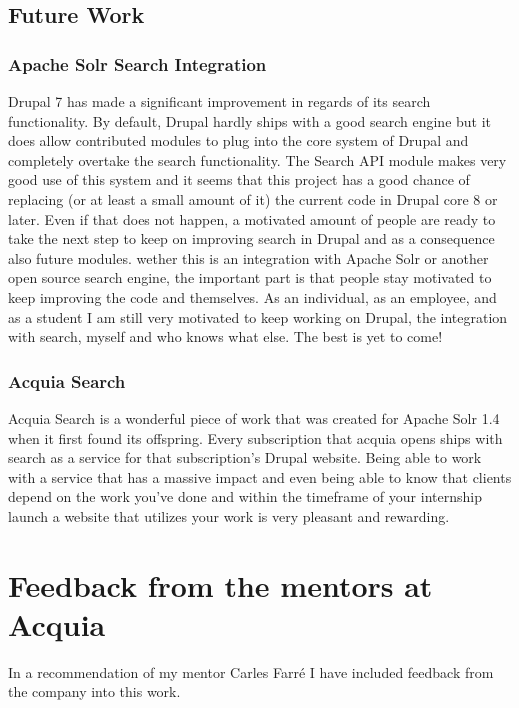 \section{Future Work}
\subsection{Apache Solr Search Integration}
Drupal 7 has made a significant improvement in regards of its search functionality. By default, Drupal hardly ships with a good search engine but it does allow contributed modules to plug into the core system of Drupal and completely overtake the search functionality. The Search API module makes very good use of this system and it seems that this project has a good chance of replacing (or at least a small amount of it) the current code in Drupal core 8 or later. Even if that does not happen, a motivated amount of people are ready to take the next step to keep on improving search in Drupal and as a consequence also future modules. wether this is an integration with Apache Solr or another open source search engine, the important part is that people stay motivated to keep improving the code and themselves. As an individual, as an employee, and as a student I am still very motivated to keep working on Drupal, the integration with search, myself and who knows what else. The best is yet to come!

\subsection{Acquia Search}
Acquia Search is a wonderful piece of work that was created for Apache Solr 1.4 when it first found its offspring. Every subscription that acquia opens ships with search as a service for that subscription's Drupal website. Being able to work with a service that has a massive impact and even being able to know that clients depend on the work you've done and within the timeframe of your internship launch a website that utilizes your work is very pleasant and rewarding.

\chapter{Feedback from the mentors at Acquia}
In a recommendation of my mentor Carles Farré I have included feedback from the company into this work.


